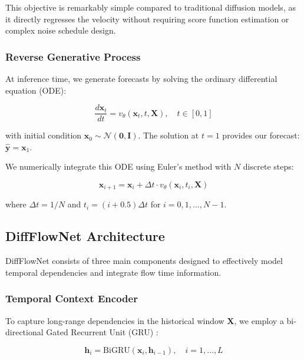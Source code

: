 \documentclass[11pt,a4paper]{article}
\begin{document}
This objective is remarkably simple compared to traditional diffusion models, as it directly regresses the velocity without requiring score function estimation or complex noise schedule design.

\subsubsection{Reverse Generative Process}

At inference time, we generate forecasts by solving the ordinary differential equation (ODE):

\begin{equation}
    \frac{d\mathbf{x}_t}{dt} = v_\theta(\mathbf{x}_t, t, \mathbf{X}), \quad t \in [0,1]
\end{equation}

with initial condition $\mathbf{x}_0 \sim \mathcal{N}(\mathbf{0}, \mathbf{I})$. The solution at $t=1$ provides our forecast: $\hat{\mathbf{y}} = \mathbf{x}_1$.

We numerically integrate this ODE using Euler's method with $N$ discrete steps:

\begin{equation}
    \mathbf{x}_{i+1} = \mathbf{x}_i + \Delta t \cdot v_\theta(\mathbf{x}_i, t_i, \mathbf{X})
\end{equation}

where $\Delta t = 1/N$ and $t_i = (i + 0.5)\Delta t$ for $i = 0, 1, \ldots, N-1$.

\subsection{DiffFlowNet Architecture}

DiffFlowNet consists of three main components designed to effectively model temporal dependencies and integrate flow time information.

\subsubsection{Temporal Context Encoder}

To capture long-range dependencies in the historical window $\mathbf{X}$, we employ a bi-directional Gated Recurrent Unit (GRU) \cite{cho2014learning}:

\begin{equation}
    \mathbf{h}_i = \text{BiGRU}(\mathbf{x}_i, \mathbf{h}_{i-1}), \quad i = 1, \ldots, L
\end{equation}
\end{document}
